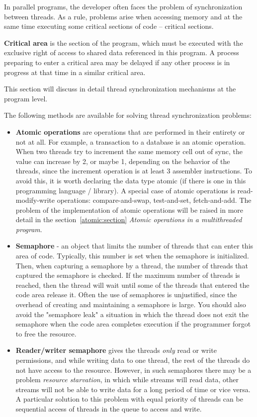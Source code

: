 { %
	\par In parallel programs, the developer often faces the problem of synchronization between threads. As a rule, problems arise when accessing memory and at the same time executing some critical sections of code – critical sections.
	\par\textbf{Critical area} is the section of the program, which must be executed with the exclusive right of access to shared data referenced in this program. A process preparing to enter a critical area may be delayed if any other process is in progress at that time in a similar critical area. 
	\par This section will discuss in detail thread synchronization mechanisms at the program level.
	\par The following methods are available for solving thread synchronization problems:
		\begin{itemize}
			\item\textbf{Atomic operations} are operations that are performed in their entirety or not at all. For example, a transaction to a database is an atomic operation. When two threads try to increment the same memory cell out of sync, the value can increase by 2, or maybe 1, depending on the behavior of the threads, since the increment operation is at least 3 assembler instructions. To avoid this, it is worth declaring the data type atomic (if there is one in this programming language / library). A special case of atomic operations is read-modify-write operations: compare-and-swap, test-and-set, fetch-and-add. The problem of the implementation of atomic operations will be raised in more detail in the section~\ref{atomic:section} \textit{Atomic operations in a multithreaded program}.
			\item\textbf{Semaphore} - an object that limits the number of threads that can enter this area of code. Typically, this number is set when the semaphore is initialized. Then, when capturing a semaphore by a thread, the number of threads that captured the semaphore is checked. If the maximum number of threads is reached, then the thread will wait until some of the threads that entered the code area release it. Often the use of semaphores is unjustified, since the overhead of creating and maintaining a semaphore is large. You should also avoid the "semaphore leak" a situation in which the thread does not exit the semaphore when the code area completes execution if the programmer forgot to free the resource.
			\item\textbf{Reader/writer semaphore} gives the threads \textit{only} read or write permissions, and while writing data to one thread, the rest of the threads do not have access to the resource. However, in such semaphores there may be a problem \textit{resource starvation}, in which while streams will read data, other streams will not be able to write data for a long period of time or vice versa. A particular solution to this problem with equal priority of threads can be sequential access of threads in the queue to access and write.

\end{itemize}}
